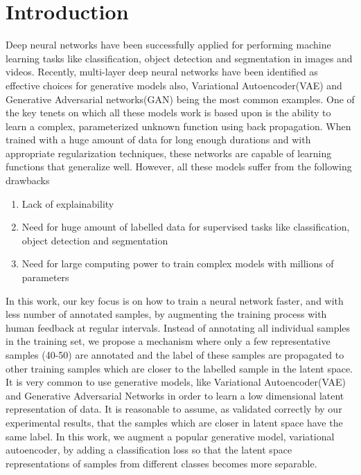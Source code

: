 \documentclass[runningheads]{llncs}
\begin{document}
\section{Introduction}
Deep neural networks have been successfully applied  for performing machine learning tasks like classification\cite{alexnet,vggnet,resnet}, object detection\cite{faster_rcnn,yolo} and segmentation\cite{deeplab,unet} in images and videos.
Recently, multi-layer deep neural networks have been identified as  effective  choices for  generative models also, Variational Autoencoder(VAE)\cite{vae} and Generative Adversarial networks(GAN)\cite{gan} being the most common examples.
One of the key tenets on which all these models work is  based upon  is the ability to learn a complex, parameterized unknown function using back propagation.
When trained with a huge amount of data for long enough durations and with appropriate regularization techniques, these networks are capable of learning functions that generalize well.
However, all these  models suffer from the following drawbacks
\begin{enumerate}
  \item Lack of explainability
  \item Need for huge amount of labelled data for supervised tasks like classification, object detection and segmentation
  \item Need for large computing power to train complex models with millions of parameters
\end{enumerate}

In this work, our key focus is on how to train a neural network faster, and with less number of annotated samples, by augmenting the training process with human feedback at regular intervals.
Instead of annotating all individual samples in the training set, we propose a mechanism where only a few representative samples (40-50) are annotated and the label of these samples are propagated to other training samples  which are closer to the labelled sample in the latent space.
It is very common to use  generative models, like Variational Autoencoder(VAE) \cite{vae} and Generative Adversarial Networks \cite{gan} in order to learn a low dimensional latent representation of data.
It is reasonable to assume, as validated correctly by our experimental results, that the samples which are closer in latent space have the same label.
In this work, we augment a popular generative model, variational autoencoder,  by adding a classification loss so that the latent space representations of samples from different classes becomes more separable.
\end{document}
